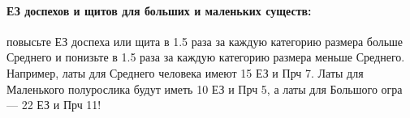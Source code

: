 \paragraph{ЕЗ доспехов и щитов для больших и маленьких существ:} повысьте ЕЗ доспеха или щита в 1.5 раза за каждую категорию размера больше Среднего и понизьте в 1.5 раза за каждую категорию размера меньше Среднего. Например, латы для Среднего человека имеют 15 ЕЗ и Прч 7. Латы для Маленького полурослика будут иметь 10 ЕЗ и Прч 5, а латы для Большого огра — 22 ЕЗ и Прч 11!